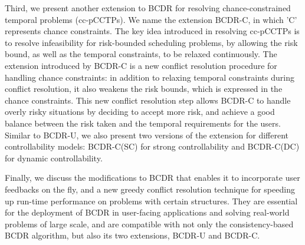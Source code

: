 \documentclass[jair,twoside,11pt,theapa]{article}
\begin{document}
Third, we present another extension to BCDR for resolving chance-constrained
temporal problems (cc-pCCTPs). We name the extension BCDR-C, in which 'C'
represents chance constraints. The key idea introduced in resolving cc-pCCTPs is
to resolve infeasibility for risk-bounded scheduling problems, by allowing the
risk bound, as well as the temporal constraints, to be relaxed continuously. The
extension introduced by BCDR-C is a new conflict resolution procedure for
handling chance constraints: in addition to relaxing temporal constraints during
conflict resolution, it also weakens the risk bounds, which is expressed in the
chance constraints. This new conflict resolution step allows BCDR-C to handle
overly risky situations by deciding to accept more risk, and achieve a good
balance between the risk taken and the temporal requirements for the users. Similar to BCDR-U, we also present two versions of the extension for different controllability models: BCDR-C(SC) for strong controllability and BCDR-C(DC) for dynamic controllability.


%


%
%


%
%
%
%
%


Finally, we discuss the modifications to BCDR that enables it to incorporate
user feedbacks on the fly, and a new greedy conflict resolution technique for
speeding up run-time performance on problems with certain structures. They are
essential for the deployment of BCDR in user-facing applications and solving
real-world problems of large scale, and are compatible with not only the consistency-based BCDR algorithm, but also its two extensions, BCDR-U and BCDR-C.
\end{document}
